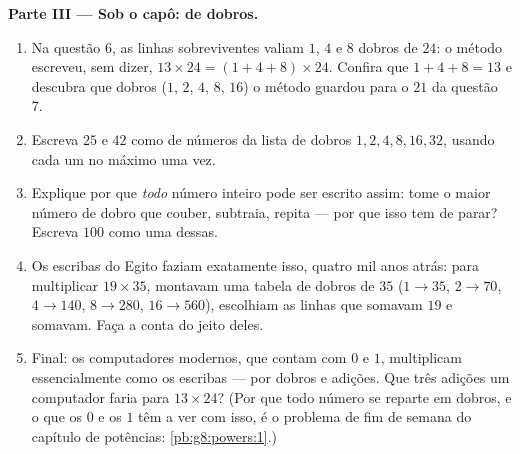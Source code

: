 \begin{problem}
\medskip
\noindent\textbf{Parte III --- Sob o capô:  de dobros.}
\begin{enumerate}[resume]
  \item Na questão 6, as linhas sobreviventes valiam $1$, $4$ e $8$
        dobros de $24$: o método escreveu, sem dizer,
        $13 \times 24 = (1 + 4 + 8) \times 24$. Confira que
        $1 + 4 + 8 = 13$ e descubra que dobros ($1$, $2$, $4$, $8$,
        $16$) o método guardou para o $21$ da questão 7.
  \item Escreva $25$ e $42$ como  de números da lista de dobros
        $1, 2, 4, 8, 16, 32$, usando cada um no máximo uma vez.
  \item Explique por que \emph{todo} número inteiro pode ser escrito
        assim: tome o maior número de dobro que couber, subtraia,
        repita --- por que isso tem de parar? Escreva $100$ como uma
         dessas.
  \item Os escribas do Egito faziam exatamente isso, quatro mil anos
        atrás: para multiplicar $19 \times 35$, montavam uma tabela de
        dobros de $35$ ($1 \to 35$, $2 \to 70$, $4 \to 140$,
        $8 \to 280$, $16 \to 560$), escolhiam as linhas que somavam
        $19$ e somavam. Faça a conta do jeito deles.
  \item Final: os computadores modernos, que contam com $0$ e $1$,
        multiplicam essencialmente como os escribas --- por dobros e
        adições. Que três adições um computador faria para
        $13 \times 24$? (Por que todo número se reparte em dobros, e o
        que os $0$ e os $1$ têm a ver com isso, é o problema de fim de
        semana do capítulo de potências: \cref{pb:g8:powers:1}.)
\end{enumerate}
\end{problem}
